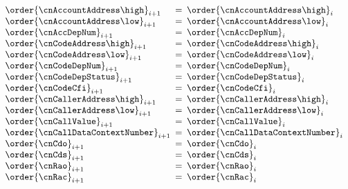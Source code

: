 \begin{description}
\[\begin{array}{lcl}
				\order{\cnAccountAddress\high  }     _{i + 1} & \!\!\! = \!\!\! & \order{\cnAccountAddress\high  }      _{i} \\
				\order{\cnAccountAddress\low   }     _{i + 1} & \!\!\! = \!\!\! & \order{\cnAccountAddress\low   }      _{i} \\
				\order{\cnAccDepNum            }     _{i + 1} & \!\!\! = \!\!\! & \order{\cnAccDepNum            }      _{i} \\
				\order{\cnCodeAddress\high     }     _{i + 1} & \!\!\! = \!\!\! & \order{\cnCodeAddress\high     }      _{i} \\
				\order{\cnCodeAddress\low      }     _{i + 1} & \!\!\! = \!\!\! & \order{\cnCodeAddress\low      }      _{i} \\
				\order{\cnCodeDepNum           }     _{i + 1} & \!\!\! = \!\!\! & \order{\cnCodeDepNum           }      _{i} \\
				\order{\cnCodeDepStatus        }     _{i + 1} & \!\!\! = \!\!\! & \order{\cnCodeDepStatus        }      _{i} \\
				\order{\cnCodeCfi              }     _{i + 1} & \!\!\! = \!\!\! & \order{\cnCodeCfi              }      _{i} \\
				\order{\cnCallerAddress\high   }     _{i + 1} & \!\!\! = \!\!\! & \order{\cnCallerAddress\high   }      _{i} \\
				\order{\cnCallerAddress\low    }     _{i + 1} & \!\!\! = \!\!\! & \order{\cnCallerAddress\low    }      _{i} \\
				\order{\cnCallValue            }     _{i + 1} & \!\!\! = \!\!\! & \order{\cnCallValue            }      _{i} \\
				\order{\cnCallDataContextNumber}     _{i + 1} & \!\!\! = \!\!\! & \order{\cnCallDataContextNumber}      _{i} \\
				\order{\cnCdo                  }     _{i + 1} & \!\!\! = \!\!\! & \order{\cnCdo                  }      _{i} \\
				\order{\cnCds                  }     _{i + 1} & \!\!\! = \!\!\! & \order{\cnCds                  }      _{i} \\
				\order{\cnRao                  }     _{i + 1} & \!\!\! = \!\!\! & \order{\cnRao                  }      _{i} \\
				\order{\cnRac                  }     _{i + 1} & \!\!\! = \!\!\! & \order{\cnRac                  }      _{i} \\

\end{array}\]
\end{description}
